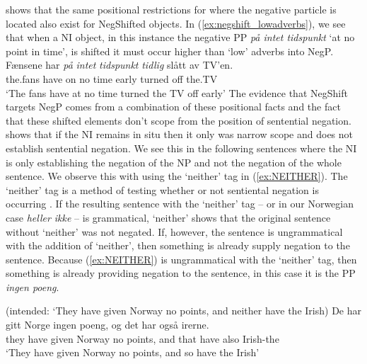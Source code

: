 \documentclass[12pt, letterpaper]{article}
\begin{document}
\citet{svenoniusStrainsNegationNorwegian2002} shows that the same positional restrictions for where the negative particle is located also exist for NegShifted objects. In (\ref{ex:negshift_lowadverbs}), we see that when a NI object, in this instance the negative PP \emph{på intet tidspunkt} `at no point in time', is shifted it must occur higher than `low' adverbs into NegP.  
\ea \label{ex:negshift_lowadverbs}
	\ea 
	{\gll Fænsene har \emph{på} \emph{intet} \emph{tidspunkt} \emph{tidlig} slått av TV’en.\\
	the.fans have on no time early turned off the.TV\\}
	\glt `The fans have at no time turned the TV off early’ 
	\z  
\z
The evidence that NegShift targets NegP comes from a combination of these positional facts and the fact that these shifted elements don't scope from the position of sentential negation. \citet{svenoniusStrainsNegationNorwegian2002} shows that if the NI remains in situ then it only was narrow scope and does not establish sentential negation. We see this in the following sentences where the NI is only establishing the negation of the NP and not the negation of the whole sentence. We observe this with using the `neither' tag in (\ref{ex:NEITHER}). The `neither' tag is a method of testing whether or not sentiental negation is occurring \citep{klimaNegationEnglish1964}. If the resulting sentence with the `neither' tag – or in our Norwegian case \emph{heller ikke} – is grammatical, `neither' shows that the original sentence without `neither' was not negated. If, however, the sentence is ungrammatical with the addition of `neither', then something is already supply negation to the sentence. Because (\ref{ex:NEITHER}) is ungrammatical with the `neither' tag, then something is already providing negation to the sentence, in this case it is the PP  \emph{ingen poeng}. 

\ea 
	\glt (intended: ‘They have given Norway no points, and neither have the Irish) \label{ex:NEITHER}
	\ex 
	\gll De har gitt Norge ingen poeng, og det har også irerne.\\
	they have given Norway no points, and that have also Irish-the\\
	\glt `They have given Norway no points, and so have the Irish'
	\z 
\z  
\end{document}
